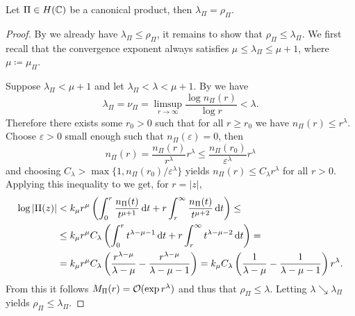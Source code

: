 \begin{theorem} \label{thm:exponent-of-convergence-Weierstraß-product}
    Let $\Pi \in H(\mathbb{C})$ be a canonical product, then $\lambda_\Pi = \rho_\Pi$.
\end{theorem}

\begin{proof}
    By  we already have $\lambda_\Pi \leq \rho_\Pi$, it remains to show that $\rho_\Pi \leq \lambda_\Pi$. We first recall that the convergence exponent always satisfies $\mu \leq \lambda_\Pi \leq \mu + 1$, where $\mu \coloneqq \mu_\Pi$.
    
    Suppose $\lambda_\Pi < \mu + 1$ and let $\lambda_\Pi < \lambda < \mu + 1$. By  we have
    $$ \lambda_\Pi = \nu_\Pi = \limsup_{r \to \infty} \frac{\log n_\Pi(r)}{\log r} < \lambda. $$
    Therefore there exists some $r_0 > 0$ such that for all $r \geq r_0$ we have $n_\Pi(r) \leq r^\lambda$. Choose $\varepsilon > 0$ small enough such that $n_\Pi(\varepsilon) = 0$, then
    \begin{equation*}
        n_\Pi(r) = \frac{n_\Pi(r)}{r^\lambda} r^\lambda \leq \frac{n_\Pi(r_0)}{\varepsilon^\lambda} r^\lambda
    \end{equation*}
    and choosing $C_\lambda > \max \{ 1, n_\Pi(r_0) / \varepsilon^\lambda \}$ yields $n_\Pi(r) \leq C_\lambda r^\lambda$ for all $r > 0$. Applying this inequality to  we get, for $r = \vert z \vert$,
    \begin{align*}
        \log \vert \Pi(z) \vert &< k_\mu r^\mu \left( \int_0^r \frac{n_\Pi(t)}{t^{\mu + 1}} \mathop{}\!\mathrm{d} t + r \int_r^\infty \frac{n_\Pi(t)}{t^{\mu + 2}} \mathop{}\!\mathrm{d} t \right) \leq \\
        &\leq k_\mu r^\mu C_\lambda \left( \int_0^r t^{\lambda - \mu - 1} \mathop{}\!\mathrm{d} t + r \int_r^\infty t^{\lambda - \mu - 2} \mathop{}\!\mathrm{d} t \right) = \\
        &= k_\mu r^\mu C_\lambda \left( \frac{r^{\lambda - \mu}}{\lambda - \mu} - \frac{r^{\lambda - \mu}}{\lambda - \mu - 1} \right) = k_\mu C_\lambda \left( \frac{1}{\lambda - \mu} - \frac{1}{\lambda - \mu - 1} \right) r^\lambda.
    \end{align*}
    From this it follows $M_\Pi(r) = \mathcal{O}(\exp r^\lambda)$ and thus that $\rho_\Pi \leq \lambda$. Letting $\lambda \searrow \lambda_\Pi$ yields $\rho_\Pi \leq \lambda_\Pi$.


\end{proof}
